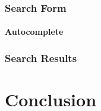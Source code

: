 \documentclass[12pt, oneside, a4paper]{book}
\begin{document}
\subsection{Search Form}

\subsubsection{Autocomplete}

\subsection{Search Results}



\chapter{Conclusion}




\end{document}
